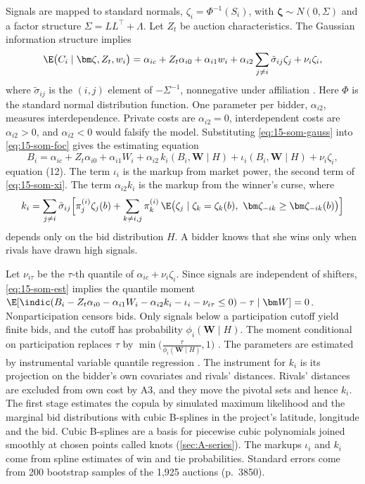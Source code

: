  Signals are mapped to standard normals, $\zeta_i=\Phi^{-1}(S_i)$, with
$\bm\zeta\sim N(0,\Sigma)$ and a factor structure $\Sigma=LL^\top+\Lambda$. Let $Z_t$ be auction characteristics.
The Gaussian information structure implies
\begin{equation}\label{eq:15-som-gauss}
  \E\bigl(C_i\mid\bm\zeta,Z_t,w_i\bigr)=\alpha_{ic}+Z_t\alpha_{i0}+\alpha_{i1}w_i
  +\alpha_{i2}\sum_{j\ne i}\tilde\sigma_{ij}\zeta_j+\nu_i\zeta_i,
\end{equation}
where $\tilde\sigma_{ij}$ is the $(i,j)$ element of $-\Sigma^{-1}$, nonnegative under affiliation
\citep[eq.~(11)]{Somaini2020}. Here $\Phi$ is the standard normal distribution function. One parameter per
bidder, $\alpha_{i2}$, measures interdependence. Private costs are $\alpha_{i2}=0$, interdependent costs are
$\alpha_{i2}>0$, and $\alpha_{i2}<0$ would falsify the model. Substituting \eqref{eq:15-som-gauss} into
\eqref{eq:15-som-foc} gives the estimating equation
\begin{equation}\label{eq:15-som-est}
  B_i=\alpha_{ic}+Z_t\alpha_{i0}+\alpha_{i1}W_i+\alpha_{i2}\,k_i(B_i,\bm W\mid H)+\iota_i(B_i,\bm W\mid H)+\nu_i\zeta_i,
\end{equation}
equation (12). The term $\iota_i$ is the markup from market power, the second term of \eqref{eq:15-som-xi}. The
term $\alpha_{i2}k_i$ is the markup from the winner's curse, where
\begin{equation*}
  k_i=\sum_{j\ne i}\tilde\sigma_{ij}\Bigl[\pi^{(i)}_j\zeta_j(b)+\sum_{k\ne i,j}\pi^{(i)}_k\,
  \E\bigl(\zeta_j\mid\zeta_k=\zeta_k(b),\ \bm\zeta_{-ik}\ge\bm\zeta_{-ik}(b)\bigr)\Bigr]
\end{equation*}
depends only on the bid distribution $H$. A bidder knows that she wins only when rivals have drawn high signals.

 Let $\nu_{i\tau}$ be the $\tau$-th quantile of $\alpha_{ic}+\nu_i\zeta_i$.
Since signals are independent of shifters, \eqref{eq:15-som-est} implies the quantile moment
$\E[\indic(B_i-Z_t\alpha_{i0}-\alpha_{i1}W_i-\alpha_{i2}k_i-\iota_i-\nu_{i\tau}\le0)-\tau\mid\bm W]=0$.
Nonparticipation censors bids. Only signals below a participation cutoff yield finite bids, and the cutoff has
probability $\phi_i(\bm W\mid H)$. The moment conditional on participation replaces $\tau$ by
$\min\bigl(\frac{\tau}{\phi_i(\bm W\mid H)},1\bigr)$ \citep[eqs.~(13)--(14)]{Somaini2020}. The parameters are
estimated by instrumental variable quantile regression \citep{ChernozhukovHansen2006}. The instrument for $k_i$
is its projection on the bidder's own covariates and rivals' distances. Rivals' distances are excluded from own
cost by A3, and they move the pivotal sets and hence $k_i$. The first stage estimates the copula by simulated
maximum likelihood and the marginal bid distributions with cubic B-splines in the project's latitude, longitude and
the bid. Cubic B-splines are a basis for piecewise cubic polynomials joined smoothly at chosen points called knots
(\cref{sec:A-series}). The markups $\iota_i$ and $k_i$ come from spline estimates of win and tie probabilities.
Standard errors come from 200 bootstrap samples of the 1,925 auctions (p.~3850).

